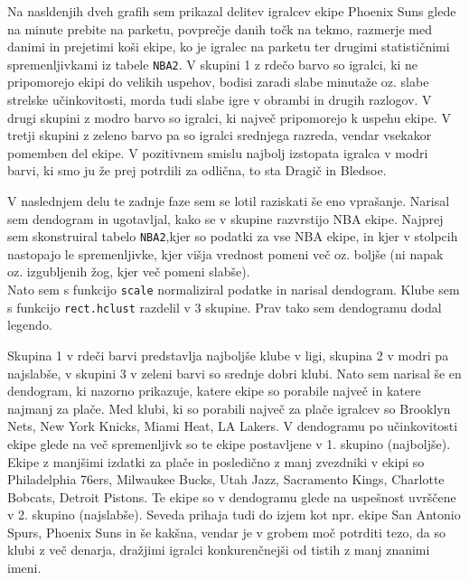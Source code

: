 \documentclass[11pt,a4paper]{article}
\begin{document}
Na nasldenjih dveh grafih sem prikazal delitev igralcev ekipe Phoenix Suns glede na minute prebite na parketu, povprečje danih točk na tekmo, razmerje med danimi in prejetimi koši ekipe, ko je igralec na parketu ter drugimi statističnimi spremenljivkami iz tabele \verb|NBA2|. V skupini 1 z rdečo barvo so igralci, ki ne pripomorejo ekipi do velikih uspehov, bodisi zaradi slabe minutaže oz. slabe strelske učinkovitosti, morda tudi slabe igre v obrambi in drugih razlogov. V drugi skupini z modro barvo so igralci, ki največ pripomorejo k uspehu ekipe. V tretji skupini z zeleno barvo pa so igralci srednjega razreda, vendar vsekakor pomemben del ekipe. V pozitivnem smislu najbolj izstopata igralca v modri barvi, ki smo ju že prej potrdili za odlična, to sta Dragič in Bledsoe.


\newpage
V naslednjem delu te zadnje faze sem se lotil raziskati še eno vprašanje. Narisal sem dendogram in ugotavljal, kako se v skupine razvrstijo NBA ekipe. Najprej sem skonstruiral tabelo \verb|NBA2|,kjer so podatki za vse NBA ekipe,
in kjer v stolpcih nastopajo le spremenljivke, kjer višja vrednost pomeni več oz. boljše (ni napak oz. izgubljenih žog, kjer več pomeni slabše).\\

Nato sem s funkcijo \verb|scale| normaliziral podatke in narisal dendogram.
Klube sem s funkcijo \verb|rect.hclust| razdelil v 3 skupine. Prav tako sem dendogramu dodal legendo.\\


\newpage
Skupina 1 v rdeči barvi predstavlja najboljše klube v ligi, skupina 2 v modri pa najslabše, v skupini 3 v zeleni barvi so srednje dobri klubi.
Nato sem narisal še en dendogram, ki nazorno prikazuje, katere ekipe so porabile največ in katere najmanj za plače. Med klubi, ki so porabili največ za plače igralcev so Brooklyn Nets, New York Knicks, Miami Heat, LA Lakers. V dendogramu po učinkovitosti ekipe glede na več spremenljivk so te ekipe postavljene v 1. skupino (najboljše). Ekipe z manjšimi izdatki za plače in posledično z manj zvezdniki v ekipi so Philadelphia 76ers, Milwaukee Bucks, Utah Jazz, Sacramento Kings, Charlotte Bobcats, Detroit Pistons. Te ekipe so v dendogramu glede na uspešnost uvrščene v 2. skupino (najslabše). Seveda prihaja tudi do izjem kot npr. ekipe San Antonio Spurs, Phoenix Suns in še kakšna, vendar je v grobem moč potrditi tezo, da so klubi z več denarja, dražjimi igralci konkurenčnejši od tistih z manj znanimi imeni.\\
\end{document}
